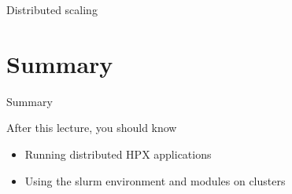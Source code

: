 \documentclass[\classoption]{beamer}
\begin{document}
\begin{frame}{Distributed scaling}

\begin{center}
\end{center}
\end{frame}

\section{Summary}
\begin{frame}{Summary}
\begin{block}{After this lecture, you should know}
\begin{itemize}
\item Running distributed HPX applications
\item Using the slurm environment and modules on clusters
\end{itemize}
\end{block}
\end{frame}
\end{document}
